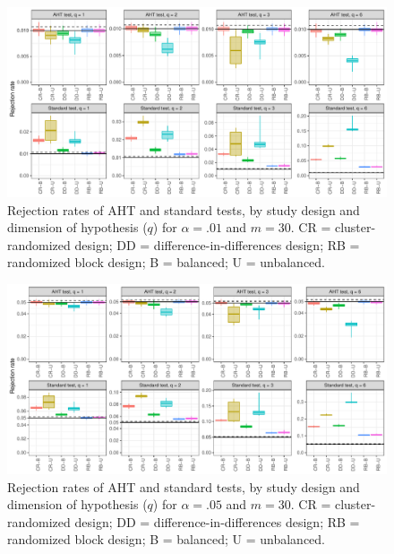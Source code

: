 \documentclass[12pt]{article}
\begin{document}
\begin{landscape}
\begin{figure}[p]
{\centering \includegraphics[width=\linewidth]{CR_fig/balance_01_30-1} 

}

\caption{Rejection rates of AHT and standard tests, by study design and dimension of hypothesis ($q$) for $\alpha = .01$ and $m = 30$. CR = cluster-randomized design; DD = difference-in-differences design; RB = randomized block design; B = balanced; U = unbalanced.}\label{fig:balance_01_30}
\end{figure}

\begin{figure}[p]

{\centering \includegraphics[width=\linewidth]{CR_fig/balance_05_30-1} 

}

\caption{Rejection rates of AHT and standard tests, by study design and dimension of hypothesis ($q$) for $\alpha = .05$ and $m = 30$. CR = cluster-randomized design; DD = difference-in-differences design; RB = randomized block design; B = balanced; U = unbalanced.}\label{fig:balance_05_30}
\end{figure}

\begin{figure}[p]


\end{figure}
\end{landscape}
\end{document}

